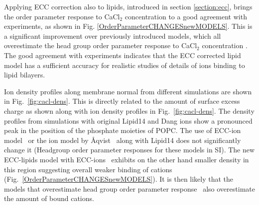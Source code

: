 \documentclass[aip,jcp,twocolumn]{revtex4}
\begin{document}
Applying ECC correction also to lipids, introduced in section \ref{section:ecc},
brings the order parameter response to CaCl$_2$ concentration to a
good agreement with experiments, as shown in Fig. \ref{OrderParameterCHANGESnewMODELS}.
This is a significant improvement over previously introduced models,
which all overestimate the head group order parameter response to CaCl$_2$
concentration \cite{catte16}. The good agreement with experiments indicates
that the ECC corrected lipid model has a sufficient accuracy for realistic
studies of details of ions binding to lipid bilayers.

Ion density profiles along membrane normal 
from different simulations are shown in Fig.~\ref{fig:cacl-dens}.
This is directly related to the amount of surface excess charge 
as shown along with ion density profiles in  Fig.~\ref{fig:cacl-dens}.
The density profiles from simulations with original Lipid14 \cite{dickson14}
and Dang ions \cite{smith94,chang1999,dang2006} 
show a pronounced peak in the position of the phosphate moieties of POPC. 
The use of ECC-ion model~\cite{Jungwirth2017,Jungwirth2015,kohagen14,kohagen16}
or the ion model by \AA{qvist}~\cite{aqvist90}
along with Lipid14 does not significantly change it 
(Headgroup order parameter responses for these models in SI).
The new ECC-lipids model with ECC-ions~\cite{Jungwirth2017,Jungwirth2015,kohagen14,kohagen16}
exhibits on the other hand smaller density in this region 
suggesting overall weaker binding of cations (Fig.~\ref{OrderParameterCHANGESnewMODELS}). 
It is then likely that the models that overestimate head group order parameter response~\cite{catte16}
also overestimate the amount of bound cations.
\end{document}
